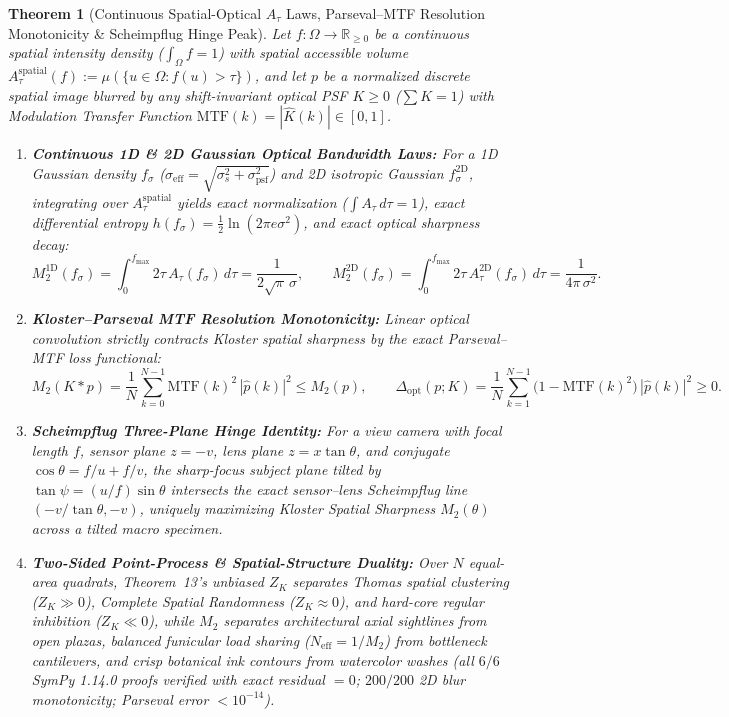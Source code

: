 \documentclass[11pt,letterpaper]{article}
\newtheorem{theorem}{Theorem}
\begin{document}
\begin{theorem}[Continuous Spatial-Optical $A_\tau$ Laws, Parseval--MTF Resolution Monotonicity \& Scheimpflug Hinge Peak]
\label{thm:spatial_optical}
Let $f:\Omega \to \mathbb{R}_{\ge 0}$ be a continuous spatial intensity density ($\int_\Omega f = 1$) with spatial accessible volume $A_\tau^{\mathrm{spatial}}(f) := \mu(\{u\in\Omega : f(u) > \tau\})$, and let $p$ be a normalized discrete spatial image blurred by any shift-invariant optical PSF $K \ge 0$ ($\sum K = 1$) with Modulation Transfer Function $\mathrm{MTF}(k) = |\widehat{K}(k)| \in [0, 1]$.
\begin{enumerate}
  \item \textbf{Continuous 1D \& 2D Gaussian Optical Bandwidth Laws:} For a 1D Gaussian density $f_\sigma$ ($\sigma_{\mathrm{eff}} = \sqrt{\sigma_s^2 + \sigma_{\mathrm{psf}}^2}$) and 2D isotropic Gaussian $f_\sigma^{\mathrm{2D}}$, integrating over $A_\tau^{\mathrm{spatial}}$ yields exact normalization ($\int A_\tau\,d\tau = 1$), exact differential entropy $h(f_\sigma) = \frac{1}{2}\ln(2\pi e \sigma^2)$, and exact optical sharpness decay:
  \begin{equation}
    M_2^{\mathrm{1D}}(f_\sigma) = \int_0^{f_{\max}} 2\tau\,A_\tau(f_\sigma)\,d\tau = \frac{1}{2\sqrt{\pi}\,\sigma},
    \qquad
    M_2^{\mathrm{2D}}(f_\sigma) = \int_0^{f_{\max}} 2\tau\,A_\tau^{\mathrm{2D}}(f_\sigma)\,d\tau = \frac{1}{4\pi\,\sigma^2}.
  \end{equation}
  \item \textbf{Kloster--Parseval MTF Resolution Monotonicity:} Linear optical convolution strictly contracts Kloster spatial sharpness by the exact Parseval--MTF loss functional:
  \begin{equation}
    M_2(K * p) = \frac{1}{N}\sum_{k=0}^{N-1} \mathrm{MTF}(k)^2\,|\widehat{p}(k)|^2 \le M_2(p),
    \qquad
    \Delta_{\mathrm{opt}}(p; K) = \frac{1}{N}\sum_{k=1}^{N-1}\big(1 - \mathrm{MTF}(k)^2\big)\,|\widehat{p}(k)|^2 \ge 0.
  \end{equation}
  \item \textbf{Scheimpflug Three-Plane Hinge Identity:} For a view camera with focal length $f$, sensor plane $z=-v$, lens plane $z=x\tan\theta$, and conjugate $\cos\theta = f/u + f/v$, the sharp-focus subject plane tilted by $\tan\psi = (u/f)\sin\theta$ intersects the exact sensor--lens Scheimpflug line $(-v/\tan\theta, -v)$, uniquely maximizing Kloster Spatial Sharpness $M_2(\theta)$ across a tilted macro specimen.
  \item \textbf{Two-Sided Point-Process \& Spatial-Structure Duality:} Over $N$ equal-area quadrats, Theorem~13's unbiased $Z_K$ separates Thomas spatial clustering ($Z_K \gg 0$), Complete Spatial Randomness ($Z_K \approx 0$), and hard-core regular inhibition ($Z_K \ll 0$), while $M_2$ separates architectural axial sightlines from open plazas, balanced funicular load sharing ($N_{\mathrm{eff}} = 1/M_2$) from bottleneck cantilevers, and crisp botanical ink contours from watercolor washes (all $6/6$ SymPy 1.14.0 proofs verified with exact residual $= 0$; $200/200$ 2D blur monotonicity; Parseval error $< 10^{-14}$).
\end{enumerate}
\end{theorem}
\end{document}
